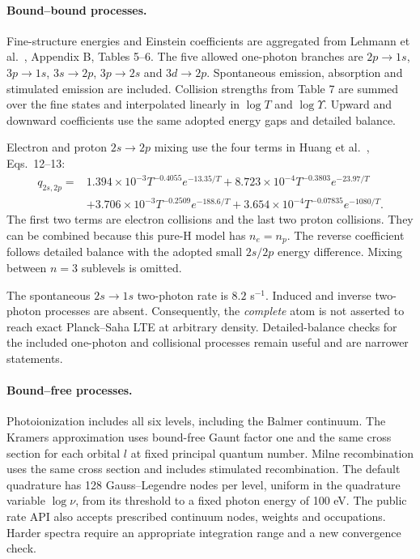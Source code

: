 \documentclass[11pt,a4paper]{article}
\begin{document}
\paragraph{Bound--bound processes.}
Fine-structure energies and Einstein coefficients are aggregated from
Lehmann et al.~\cite{lehmann}, Appendix B, Tables 5--6. The five allowed
one-photon branches are $2p\to1s$, $3p\to1s$, $3s\to2p$, $3p\to2s$ and
$3d\to2p$. Spontaneous emission, absorption and stimulated emission are
included. Collision strengths from Table 7 are summed over the fine states
and interpolated linearly in $\log T$ and $\log\Upsilon$. Upward and downward
coefficients use the same adopted energy gaps and detailed balance.

Electron and proton $2s\to2p$ mixing use the four terms in Huang et
al.~\cite{huang}, Eqs.~12--13:
\begin{align*}
 q_{2s,2p}={}&1.394\times10^{-3}T^{-0.4055}e^{-13.35/T}
 +8.723\times10^{-4}T^{-0.3803}e^{-23.97/T}\\
 &+3.706\times10^{-3}T^{-0.2509}e^{-188.6/T}
 +3.654\times10^{-4}T^{-0.07835}e^{-1080/T}.
\end{align*}
The first two terms are electron collisions and the last two proton
collisions. They can be combined because this pure-H model has $n_e=n_p$.
The reverse coefficient follows detailed balance with the adopted small
$2s/2p$ energy difference. Mixing between $n=3$ sublevels is omitted.

The spontaneous $2s\to1s$ two-photon rate is $8.2$ s$^{-1}$. Induced and
inverse two-photon processes are absent. Consequently, the \emph{complete}
atom is not asserted to reach exact Planck--Saha LTE at arbitrary density.
Detailed-balance checks for the included one-photon and collisional processes
remain useful and are narrower statements.

\paragraph{Bound--free processes.}
Photoionization includes all six levels, including the Balmer continuum.
The Kramers approximation uses bound-free Gaunt factor one and the same
cross section for each orbital $l$ at fixed principal quantum number.
Milne recombination uses the same cross section and includes stimulated
recombination. The default quadrature has 128 Gauss--Legendre nodes per
level, uniform in the quadrature variable $\log\nu$, from its threshold
to a fixed photon energy of 100 eV. The public rate API also accepts
prescribed continuum nodes, weights and occupations. Harder spectra require
an appropriate integration range and a new convergence check.
\end{document}
